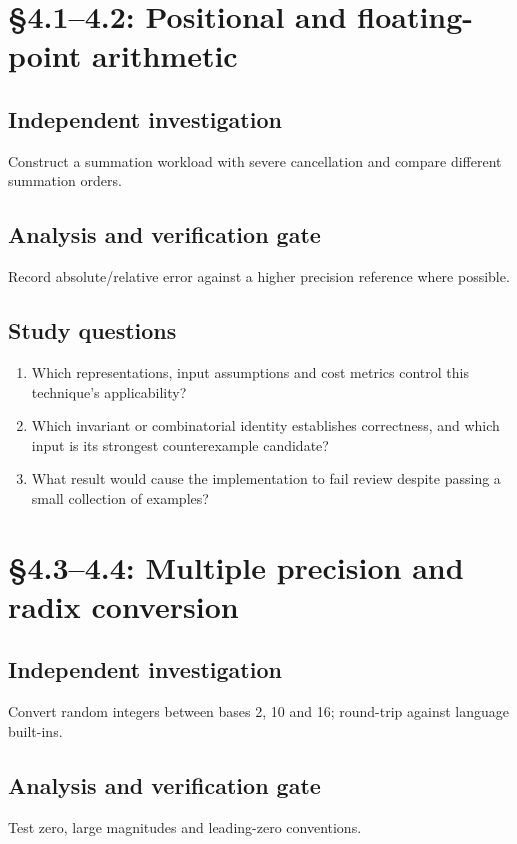 \documentclass[11pt,letterpaper]{article}
\begin{document}
\section{\S 4.1--4.2: Positional and floating-point arithmetic}
\subsection{Independent investigation}
Construct a summation workload with severe cancellation and compare different summation orders.
\subsection{Analysis and verification gate}
Record absolute/relative error against a higher precision reference where possible.
\subsection{Study questions}
\begin{enumerate}
\item Which representations, input assumptions and cost metrics control this technique's applicability?
\item Which invariant or combinatorial identity establishes correctness, and which input is its strongest counterexample candidate?
\item What result would cause the implementation to fail review despite passing a small collection of examples?
\end{enumerate}

\section{\S 4.3--4.4: Multiple precision and radix conversion}
\subsection{Independent investigation}
Convert random integers between bases 2, 10 and 16; round-trip against language built-ins.
\subsection{Analysis and verification gate}
Test zero, large magnitudes and leading-zero conventions.
\end{document}
